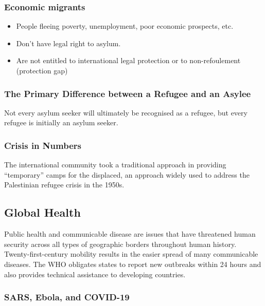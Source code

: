 \documentclass[
]{book}
\begin{document}
\hypertarget{economic-migrants}{%
\subsubsection{Economic migrants}\label{economic-migrants}}

\begin{itemize}
\item
  People fleeing poverty, unemployment, poor economic prospects, etc.
\item
  Don't have legal right to asylum.
\item
  Are not entitled to international legal protection or to non-refoulement (protection gap)
\end{itemize}

\hypertarget{the-primary-difference-between-a-refugee-and-an-asylee}{%
\subsubsection{The Primary Difference between a Refugee and an Asylee}\label{the-primary-difference-between-a-refugee-and-an-asylee}}

Not every asylum seeker will ultimately be recognised as a refugee, but every refugee is initially an asylum seeker.

\hypertarget{crisis-in-numbers}{%
\subsubsection{Crisis in Numbers}\label{crisis-in-numbers}}

The international community took a traditional approach in providing ``temporary'' camps for the displaced, an approach widely used to address the Palestinian refugee crisis in the 1950s.

\hypertarget{global-health}{%
\subsection{Global Health}\label{global-health}}

Public health and communicable disease are issues that have threatened human security across all types of geographic borders throughout human history. Twenty-first-century mobility results in the easier spread of many communicable diseases. The WHO obligates states to report new outbreaks within 24 hours and also provides technical assistance to developing countries.

\hypertarget{sars-ebola-and-covid-19}{%
\subsubsection{SARS, Ebola, and COVID-19}\label{sars-ebola-and-covid-19}}
\end{document}
